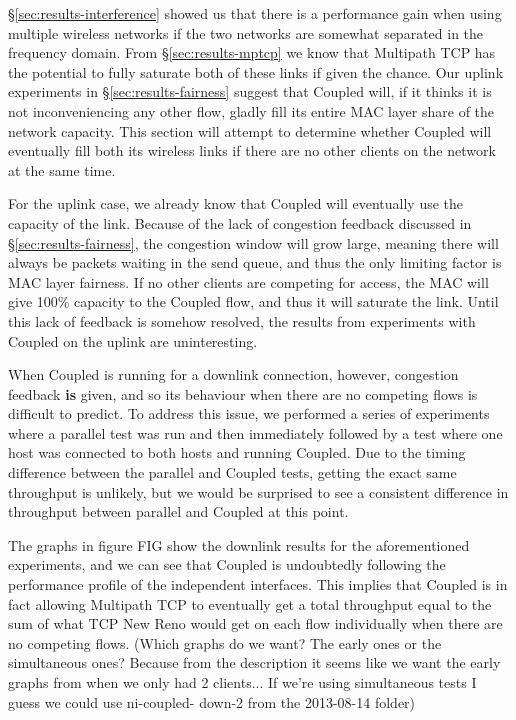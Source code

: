 \S\ref{sec:results-interference} showed us that there is a performance
gain when using multiple wireless networks if the two networks are somewhat 
separated in the frequency domain. From \S\ref{sec:results-mptcp} we know that 
Multipath TCP has the potential to fully saturate both of these links if given 
the chance. Our uplink experiments in \S\ref{sec:results-fairness} suggest that 
Coupled will, if it thinks it is not inconveniencing any other flow, gladly fill 
its entire MAC layer share of the network capacity. This section will attempt to 
determine whether Coupled will eventually fill both its wireless links if there 
are no other clients on the network at the same time.

For the uplink case, we already know that Coupled will eventually use the
capacity of the link. Because of the lack of congestion feedback discussed in
\S\ref{sec:results-fairness}, the congestion window will grow large,
meaning there will always be packets waiting in the send queue, and thus the
only limiting factor is MAC layer fairness. If no other clients are competing
for access, the MAC will give 100\% capacity to the Coupled flow, and thus it
will saturate the link. Until this lack of feedback is somehow resolved, the 
results from experiments with Coupled on the uplink are uninteresting. %

When Coupled is running for a downlink connection, however, congestion feedback
\textbf{is} given, and so its behaviour when there are no competing flows is 
difficult to predict. To address this issue, we performed a series of 
experiments where a parallel test was run and then immediately followed by a 
test where one host was connected to both hosts and running Coupled. Due to the 
timing difference between the parallel and Coupled tests, getting the exact same 
throughput is unlikely, but we would be surprised to see a consistent difference 
in throughput between parallel and Coupled at this point.

The graphs in figure FIG show the downlink results for the aforementioned
experiments, and we can see that Coupled is undoubtedly following the
performance profile of the independent interfaces. This implies that Coupled is
in fact allowing Multipath TCP to eventually get a total throughput equal to the
sum of what TCP New Reno would get on each flow individually when there are no
competing flows. 
(Which graphs do we want? The early ones or the simultaneous ones? Because from 
the description it seems like we want the early graphs from when we only had 2 
clients... If we're using simultaneous tests I guess we could use ni-coupled-
down-2 from the  2013-08-14 folder)
